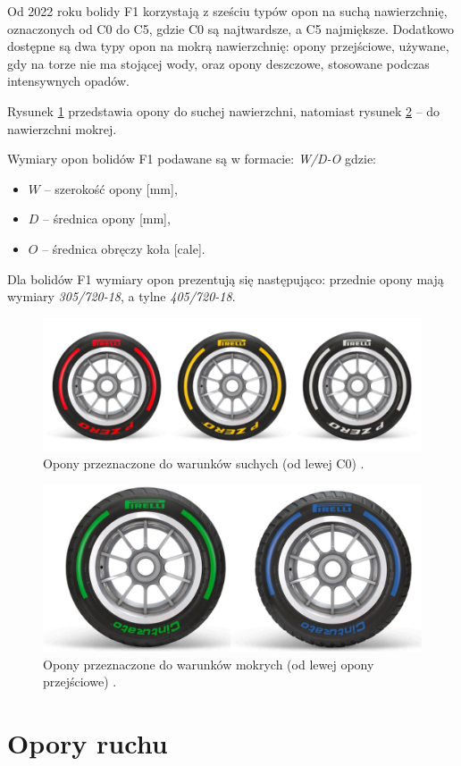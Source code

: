 \documentclass{article}
\begin{document}
	Od 2022 roku bolidy F1 korzystają z sześciu typów opon na suchą nawierzchnię, oznaczonych od C0 do C5, gdzie C0 są najtwardsze, a C5 najmiększe. Dodatkowo dostępne są dwa typy opon na mokrą nawierzchnię: opony przejściowe, używane, gdy na torze nie ma stojącej wody, oraz opony deszczowe, stosowane podczas intensywnych opadów.  
	
	Rysunek \ref{fig:tires_dry} przedstawia opony do suchej nawierzchni, natomiast rysunek \ref{fig:tires_wet} – do nawierzchni mokrej.
	
	Wymiary opon bolidów F1 podawane są w formacie: \textit{W/D-O} gdzie:
	\begin{itemize}
		\item $W$ – szerokość opony [mm],
		\item $D$ – średnica opony [mm],
		\item $O$ – średnica obręczy koła [cale].
	\end{itemize}
	
	Dla bolidów F1 wymiary opon prezentują się następująco: przednie opony mają wymiary \textit{305/720-18}, a tylne \textit{405/720-18}.
	
	\begin{figure}[h!]
		\centering
		\includegraphics[scale=0.25]{dry_tires.jpg}
		\caption{Opony przeznaczone do warunków suchych (od lewej C0) \cite{tires}.}
		\label{fig:tires_dry}
	\end{figure}
	
	\begin{figure}[h!]
		\centering
		\includegraphics[scale=0.25]{wet_tires.jpg}
		\caption{Opony przeznaczone do warunków mokrych (od lewej opony przejściowe) \cite{tires}.}
		\label{fig:tires_wet}
	\end{figure}
	
	\section{Opory ruchu}
	
	 
\end{document}
